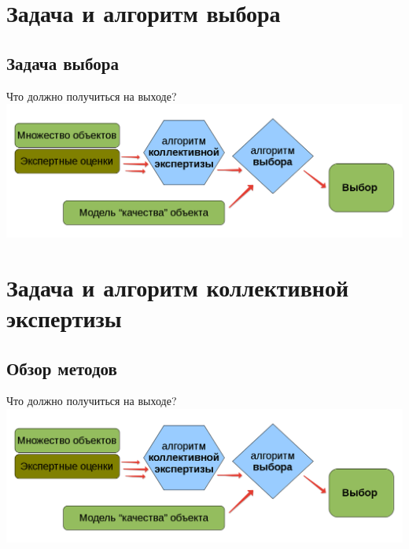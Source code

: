 \section{Задача и алгоритм выбора}
\subsection{Задача выбора}
\begin{frame}{Что должно получиться на выходе?}
	\includegraphics[width=1\linewidth]{./pic/globalscheme}
\end{frame} %


\section{Задача и алгоритм коллективной экспертизы}
\subsection{Обзор методов}
\begin{frame}{Что должно получиться на выходе?}
	\includegraphics[width=1\linewidth]{./pic/globalscheme}
\end{frame} %



